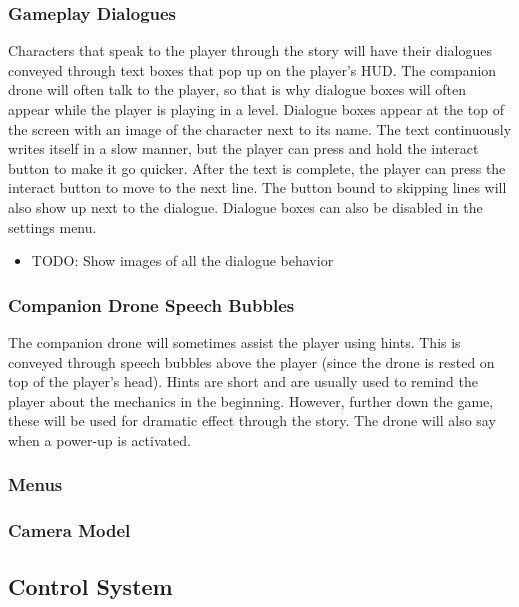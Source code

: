 \documentclass[12pt]{article}
\begin{document}
\subsubsection{Gameplay Dialogues}

Characters that speak to the player through the story will have their dialogues conveyed through text boxes that pop up on the player's HUD. The companion drone will often talk to the player, so that is why dialogue boxes will often appear while the player is playing in a level. Dialogue boxes appear at the top of the screen with an image of the character next to its name. The text continuously writes itself in a slow manner, but the player can press and hold the interact button to make it go quicker. After the text is complete, the player can press the interact button to move to the next line. The button bound to skipping lines will also show up next to the dialogue. Dialogue boxes can also be disabled in the settings menu. 

\begin{itemize}
	\item TODO: Show images of all the dialogue behavior
\end{itemize}

\subsubsection{Companion Drone Speech Bubbles}

The companion drone will sometimes assist the player using hints. This is conveyed through speech bubbles above the player (since the drone is rested on top of the player's head). Hints are short and are usually used to remind the player about the mechanics in the beginning. However, further down the game, these will be used for dramatic effect through the story. The drone will also say when a power-up is activated. 

\subsubsection{Menus}

\subsubsection{Camera Model}

\subsection{Control System}
\end{document}
